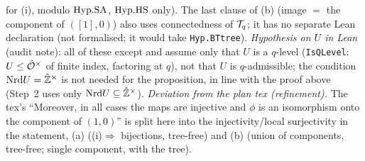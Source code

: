 \begin{sloppypar}
 for (i), modulo $\mathrm{Hyp.SA}$, $\mathrm{Hyp.HS}$ only). The last clause of (b) (image $=$ the
component of $([1],0)$) also uses connectedness of $\mathcal{T}_q$; it has no separate Lean declaration (not formalised; it would take
\texttt{Hyp.BTtree}).
\emph{Hypothesis on $U$ in Lean} (audit note): all of these except  and 
assume only that $U$ is a $q$-level (\texttt{IsQLevel}: $U\le\hat{\mathcal{O}}^\times$ of finite index, factoring at $q$), not that $U$ is
$q$-admissible; the condition $\mathrm{Nrd} U=\hat{\mathbb{Z}}^\times$ is not needed for the proposition, in line with the proof above (Step~2 uses only
$\mathrm{Nrd} U\subseteq\hat{\mathbb{Z}}^\times$).
\emph{Deviation from the plan tex (refinement).} The tex's ``Moreover, in all cases the maps are injective and $\phi$ is an isomorphism
onto the component of $(1,0)$'' is split here into the injectivity/local surjectivity in the statement, (a) ((i)$\Rightarrow$ bijections,
tree-free) and (b) (union of components, tree-free; single component, with the tree).\end{sloppypar}

